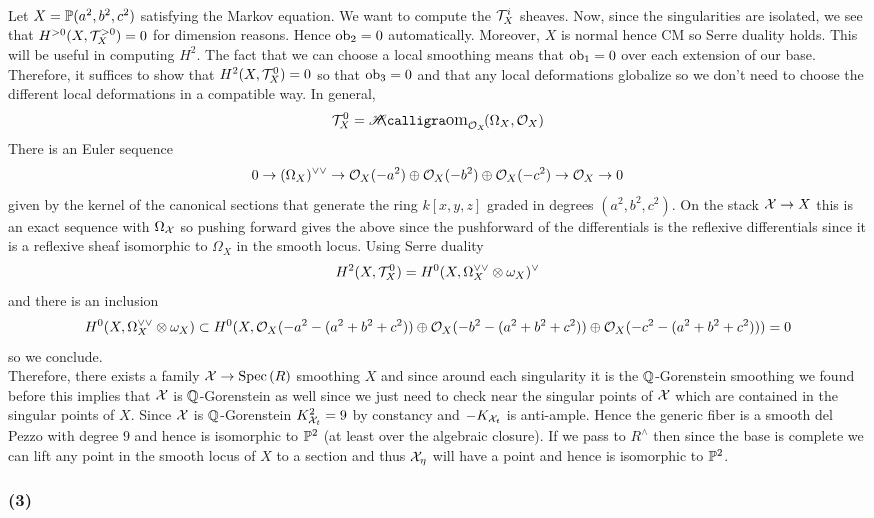 \documentclass[12pt]{article}
\begin{document}
\bigskip\\
Let $X = \P(a^2, b^2, c^2)$ satisfying the Markov equation. We want to compute the $\T^i_X$ sheaves. Now, since the singularities are isolated, we see that $H^{>0}(X, \T^{>0}_X) = 0$ for dimension reasons. Hence $\ob_2 = 0$ automatically. Moreover, $X$ is normal hence CM so Serre duality holds. This will be useful in computing $H^2$. The fact that we can choose a local smoothing means that $\ob_1 = 0$ over each extension of our base. Therefore, it suffices to show that $H^2(X, \T^0_X) = 0$ so that $\ob_3 = 0$ and that any local deformations globalize so we don't need to choose the different local deformations in a compatible way. In general,
\[ \T^0_X = \shHom{\struct{X}}{\Omega_X}{\struct{X}} \]
There is an Euler sequence
\[ 0 \to (\Omega_X)^{\vee \vee} \to \struct{X}(-a^2) \oplus \struct{X}(-b^2) \oplus \struct{X}(-c^2) \to \struct{X} \to 0 \]
given by the kernel of the canonical sections that generate the ring $k[x,y,z]$ graded in degrees $(a^2, b^2, c^2)$. On the stack $\X \to X$ this is an exact sequence with $\Omega_{\X}$ so pushing forward gives the above since the pushforward of the differentials is the reflexive differentials since it is a reflexive sheaf isomorphic to $\Omega_X$ in the smooth locus. Using Serre duality
\[ H^2(X, \T^0_X) = H^0(X, \Omega_X^{\vee \vee} \ot \omega_X)^\vee \]
and there is an inclusion
\[ H^0(X, \Omega_X^{\vee \vee} \ot \omega_X) \subset H^0(X, \struct{X}(-a^2 - (a^2 + b^2 + c^2)) \oplus \struct{X}(-b^2 - (a^2 + b^2 + c^2)) \oplus \struct{X}(-c^2 - (a^2 + b^2 + c^2))) = 0 \]
so we conclude.
\bigskip\\
Therefore, there exists a family $\X \to \Spec{R}$ smoothing $X$ and since around each singularity it is the $\Q$-Gorenstein smoothing we found before this implies that $\X$ is $\Q$-Gorenstein as well since we just need to check near the singular points of $\X$ which are contained in the singular points of $X$. Since $\X$ is $\Q$-Gorenstein $K_{\X_t}^2 = 9$ by constancy and $-K_{\X_t}$ is anti-ample. Hence the generic fiber is a smooth del Pezzo with degree $9$ and hence is isomorphic to $\P^2$ (at least over the algebraic closure). If we pass to $R^{\wedge}$ then since the base is complete we can lift any point in the smooth locus of $X$ to a section and thus $\X_{\eta}$ will have a point and hence is isomorphic to $\P^2$. 

\subsubsection{(3)}
\end{document}
